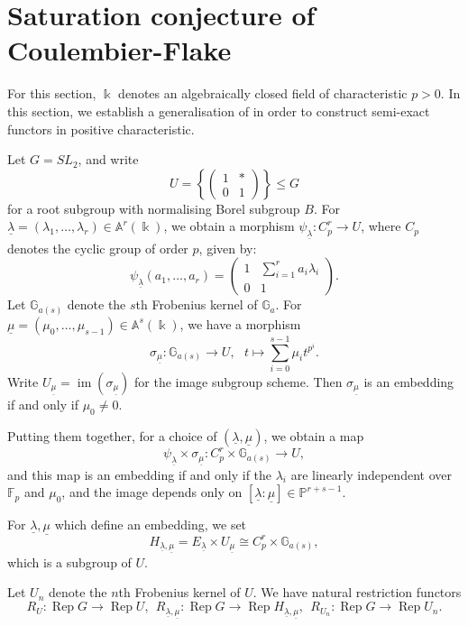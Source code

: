 \documentclass[11pt]{amsart}
\def\G{\mathbb{G}}
\def\A{\mathbb{A}}
\def\F{\mathbb{F}}
\def\A{\mathbb{A}}
\def\Rep{\operatorname{Rep}}
\def\ul{\underline}
\theoremstyle{definition}
\theoremstyle{remark}
\numberwithin{equation}{section}
\begin{document}
\section{Saturation conjecture of Coulembier-Flake}

For this section, $\Bbbk$ denotes an algebraically closed field of characteristic $p>0$.  In this section, we establish a generalisation of \cite[Conj.~5.4.2(1)]{CF} in order to construct semi-exact functors in positive characteristic.

Let $G=SL_2$, and write 
\[
U=\left\{\begin{pmatrix}1 & *\\0 & 1\end{pmatrix}\right\}\leq G
\]
for a root subgroup with normalising Borel subgroup $B$. 
 For $\underline{\lambda}=(\lambda_1,\dots,\lambda_r)\in\A^r(\Bbbk)$, we obtain a morphism $\psi_{\underline{\lambda}}:C_p^r\to U$, where $C_p$ denotes the cyclic group of order $p$, given by:
\[
\psi_{\underline{\lambda}}(a_1,\dots,a_r)=\begin{pmatrix}
    1 & \sum\limits_{i=1}^ra_i\lambda_i \\ 0 & 1
\end{pmatrix}.
\]
Let $\G_{a(s)}$ denote the $s$th Frobenius kernel of $\G_a$.  For $\underline{\mu}=(\mu_0,\dots,\mu_{s-1})\in\A^s(\Bbbk)$, we have a morphism
\[
\sigma_{\underline{\mu}}:\G_{a(s)}\to U, \ \ \ t\mapsto \sum\limits_{i=0}^{s-1}\mu_it^{p^i}.
\]
Write $U_{\underline{\mu}}=\operatorname{im}(\sigma_{\underline{\mu}})$ for the image subgroup scheme.  Then $\sigma_{\underline{\mu}}$ is an embedding if and only if $\mu_0\neq0$.

Putting them together, for a choice of $(\ul{\lambda},\ul{\mu})$, we obtain a map
\[
\psi_{\ul{\lambda}}\times\sigma_{\ul{\mu}}:C_p^r\times\G_{a(s)}\to U,
\]
and this map is an embedding if and only if the $\lambda_i$ are linearly independent over $\F_p$ and $\mu_0$, and the image depends only on $[\ul{\lambda}:\ul{\mu}]\in\mathbb{P}^{r+s-1}$.  

For $\ul{\lambda},\ul{\mu}$ which define an embedding, we set
\[
H_{\underline{\lambda},\underline{\mu}}=E_{\underline{\lambda}}\times U_{\underline{\mu}}\cong C_p^r\times \mathbb{G}_{a(s)},
\]
which is a subgroup of $U$.

Let $U_n$ denote the $n$th Frobenius kernel of $U$.  We have natural restriction functors
\[
R_U:\Rep G\to \Rep U, \ \ R_{\underline{\lambda},\underline{\mu}}:\Rep G\to \Rep H_{\underline{\lambda},\underline{\mu}}, \ \ R_{U_n}:\Rep G\to \Rep U_n.
\]
\end{document}
